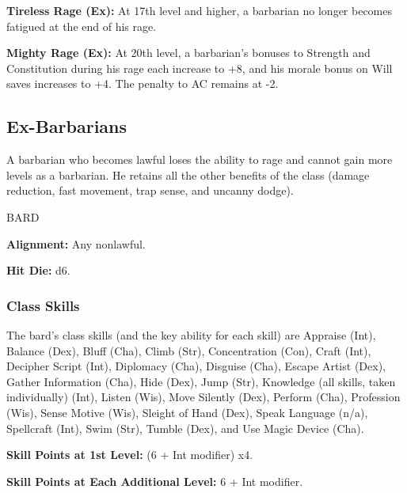 \documentclass{article}
\begin{document}
\textbf{Tireless Rage (Ex):} At 17th level and higher, a barbarian no longer becomes 
fatigued at the end of his rage.

\textbf{Mighty Rage (Ex):} At 20th level, a barbarian's bonuses to Strength and 
Constitution during his rage each increase to +8, and his morale bonus on Will 
saves increases to +4. The penalty to AC remains at -2.

\vspace{12pt}
\subsection*{\textbf{Ex-Barbarians}}

A barbarian who becomes lawful loses the ability to rage and cannot gain more levels 
as a barbarian. He retains all the other benefits of the class (damage reduction, 
fast movement, trap sense, and uncanny dodge).

\vspace{12pt}
{\LARGE{}BARD}

\textbf{Alignment:} Any nonlawful.

\textbf{Hit Die:} d6.

\vspace{12pt}
\subsubsection*{\textbf{Class Skills}}

The bard's class skills (and the key ability for each skill) are Appraise (Int), 
Balance (Dex), Bluff (Cha), Climb (Str), Concentration (Con), Craft (Int), Decipher 
Script (Int), Diplomacy (Cha), Disguise (Cha), Escape Artist (Dex), Gather Information 
(Cha), Hide (Dex), Jump (Str), Knowledge (all skills, taken individually) (Int), 
Listen (Wis), Move Silently (Dex), Perform (Cha), Profession (Wis), Sense Motive 
(Wis), Sleight of Hand (Dex), Speak Language (n/a), Spellcraft (Int), Swim (Str), 
Tumble (Dex), and Use Magic Device (Cha).

\textbf{Skill Points at 1st Level:} (6 + Int modifier) x4.

\textbf{Skill Points at Each Additional Level:} 6 + Int modifier.
\end{document}
